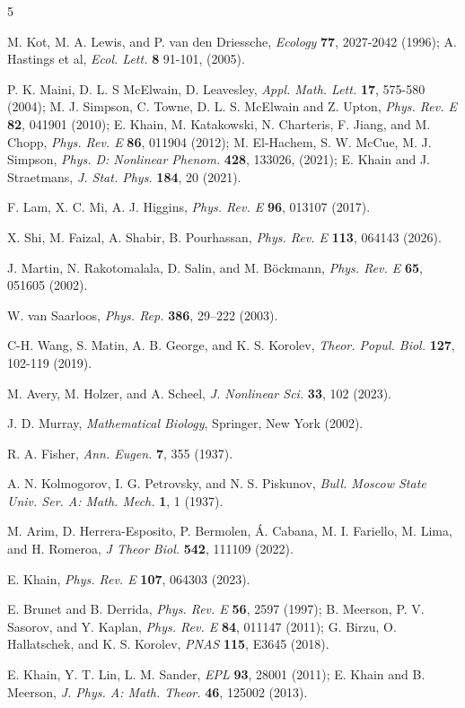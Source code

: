 \documentclass[pre,aps,twocolumn,showpacs]{revtex4}
\begin{document}
\begin{thebibliography}{5}

 M. Kot, M. A. Lewis, and P. van den Driessche, {\it Ecology} {\bf 77}, 2027-2042 (1996); A. Hastings et al, {\it Ecol. Lett.} {\bf 8}  91-101, (2005).

 P. K. Maini, D. L. S McElwain, D. Leavesley, {\it Appl. Math. Lett.} {\bf 17}, 575-580 (2004); M. J. Simpson, C. Towne, D. L. S. McElwain and Z. Upton, {\it Phys. Rev. E} {\bf 82}, 041901 (2010); E. Khain, M. Katakowski, N. Charteris, F. Jiang, and M. Chopp, {\it Phys. Rev. E} {\bf 86}, 011904 (2012); M. El-Hachem, S. W. McCue, M. J. Simpson, {\it Phys. D: Nonlinear Phenom.} {\bf 428}, 133026, (2021); E. Khain and J. Straetmans, {\it J. Stat. Phys.} {\bf 184}, 20 (2021).

 F. Lam, X. C. Mi, A. J. Higgins, {\it Phys. Rev. E} {\bf 96}, 013107 (2017).

 X. Shi, M. Faizal, A. Shabir, B. Pourhassan, {\it Phys. Rev. E} {\bf 113}, 064143 (2026).

 J. Martin, N. Rakotomalala, D. Salin, and M. Böckmann, {\it Phys. Rev. E} {\bf 65}, 051605 (2002).

 W. van Saarloos, {\it Phys. Rep.} {\bf 386}, 29–222 (2003).

 C-H. Wang, S. Matin, A. B. George, and K. S. Korolev, {\it Theor. Popul. Biol.} {\bf 127}, 102-119 (2019).

 M. Avery, M. Holzer, and A. Scheel, {\it J. Nonlinear Sci.} {\bf 33}, 102 (2023).

 J. D. Murray, {\em Mathematical Biology}, Springer, New York (2002).

 R. A. Fisher, {\em Ann. Eugen.} {\bf 7}, 355 (1937).

 A. N. Kolmogorov, I. G. Petrovsky, and N. S. Piskunov, {\em Bull. Moscow State Univ. Ser. A: Math. Mech.} {\bf 1}, 1 (1937).

 M. Arim, D. Herrera-Esposito, P. Bermolen, Á. Cabana, M. I. Fariello, M. Lima, and H. Romeroa, {\it J Theor Biol.} {\bf 542}, 111109 (2022).

 E. Khain, {\it Phys. Rev. E} {\bf 107}, 064303 (2023).

 E. Brunet and B. Derrida, {\it Phys. Rev. E} {\bf 56}, 2597 (1997); B. Meerson, P. V. Sasorov, and  Y. Kaplan, {\it Phys. Rev. E} {\bf 84}, 011147 (2011); G. Birzu, O. Hallatschek, and K. S. Korolev, {\it PNAS} {\bf 115}, E3645 (2018).

 E. Khain, Y. T. Lin, L. M. Sander, {\it EPL} {\bf 93}, 28001 (2011); E. Khain and B. Meerson, {\it J. Phys. A: Math. Theor.} \textbf{46}, 125002 (2013).

\end{thebibliography}
\end{document}
